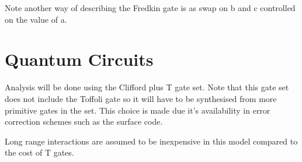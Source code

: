 Note another way of describing the Fredkin gate is as swap on b and c controlled on the value of a.


\section{Quantum Circuits}

Analysis will be done using the Clifford plus T gate set.  Note that this gate
set does not include the Toffoli gate so it will have to be synthesised from
more primitive gates in the set.  This choice is made due it's availability in
error correction schemes such as the surface code\cites{}.

Long range interactions are assumed to be inexpensive in this model compared to
the cost of T gates.

